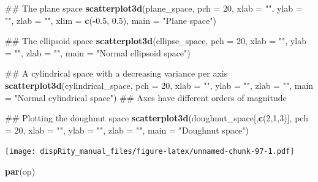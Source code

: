\documentclass[]{book}
\newenvironment{Shaded}{\begin{snugshade}}{\end{snugshade}}
\newcommand{\KeywordTok}[1]{\textcolor[rgb]{0.13,0.29,0.53}{\textbf{#1}}}
\newcommand{\DataTypeTok}[1]{\textcolor[rgb]{0.13,0.29,0.53}{#1}}
\newcommand{\DecValTok}[1]{\textcolor[rgb]{0.00,0.00,0.81}{#1}}
\newcommand{\FloatTok}[1]{\textcolor[rgb]{0.00,0.00,0.81}{#1}}
\newcommand{\StringTok}[1]{\textcolor[rgb]{0.31,0.60,0.02}{#1}}
\newcommand{\OperatorTok}[1]{\textcolor[rgb]{0.81,0.36,0.00}{\textbf{#1}}}
\newcommand{\NormalTok}[1]{#1}
\theoremstyle{definition}
\theoremstyle{definition}
\theoremstyle{definition}
\theoremstyle{remark}
\begin{document}
\begin{Shaded}
\begin{Highlighting}[]
\NormalTok{## The plane space}
\KeywordTok{scatterplot3d}\NormalTok{(plane_space, }\DataTypeTok{pch =} \DecValTok{20}\NormalTok{, }\DataTypeTok{xlab =} \StringTok{""}\NormalTok{, }\DataTypeTok{ylab =} \StringTok{""}\NormalTok{, }\DataTypeTok{zlab =} \StringTok{""}\NormalTok{,}
              \DataTypeTok{xlim =} \KeywordTok{c}\NormalTok{(}\OperatorTok{-}\FloatTok{0.5}\NormalTok{, }\FloatTok{0.5}\NormalTok{), }\DataTypeTok{main =} \StringTok{"Plane space"}\NormalTok{)}

\NormalTok{## The ellipsoid space}
\KeywordTok{scatterplot3d}\NormalTok{(ellipse_space, }\DataTypeTok{pch =} \DecValTok{20}\NormalTok{, }\DataTypeTok{xlab =} \StringTok{""}\NormalTok{, }\DataTypeTok{ylab =} \StringTok{""}\NormalTok{, }\DataTypeTok{zlab =} \StringTok{""}\NormalTok{,}
              \DataTypeTok{main =} \StringTok{"Normal ellipsoid space"}\NormalTok{)}

\NormalTok{## A cylindrical space with a decreasing variance per axis}
\KeywordTok{scatterplot3d}\NormalTok{(cylindrical_space, }\DataTypeTok{pch =} \DecValTok{20}\NormalTok{, }\DataTypeTok{xlab =} \StringTok{""}\NormalTok{, }\DataTypeTok{ylab =} \StringTok{""}\NormalTok{, }\DataTypeTok{zlab =} \StringTok{""}\NormalTok{,}
              \DataTypeTok{main =} \StringTok{"Normal cylindrical space"}\NormalTok{)}
\NormalTok{## Axes have different orders of magnitude}

\NormalTok{## Plotting the doughnut space}
\KeywordTok{scatterplot3d}\NormalTok{(doughnut_space[,}\KeywordTok{c}\NormalTok{(}\DecValTok{2}\NormalTok{,}\DecValTok{1}\NormalTok{,}\DecValTok{3}\NormalTok{)], }\DataTypeTok{pch =} \DecValTok{20}\NormalTok{, }\DataTypeTok{xlab =} \StringTok{""}\NormalTok{, }\DataTypeTok{ylab =} \StringTok{""}\NormalTok{,}
              \DataTypeTok{zlab =} \StringTok{""}\NormalTok{, }\DataTypeTok{main =} \StringTok{"Doughnut space"}\NormalTok{)}
\end{Highlighting}
\end{Shaded}

\texttt{[image: dispRity\_manual\_files/figure-latex/unnamed-chunk-97-1.pdf]}

\begin{Shaded}
\begin{Highlighting}[]
\KeywordTok{par}\NormalTok{(op)}
\end{Highlighting}
\end{Shaded}
\end{document}
